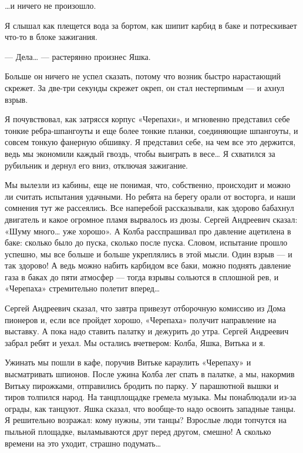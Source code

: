 …и ничего не произошло.

Я слышал  как  плещется  вода  за  бортом,  как  шипит  карбид  в  баке  и
потрескивает что-то в блоке зажигания.

— Дела… — растерянно произнес Яшка.

Больше он ничего не  успел сказать, потому  что возник быстро  нарастающий
скрежет. За две-три секунды скрежет окреп,  он стал нестерпимым — и  ахнул
взрыв.

Я почувствовал,  как затрясся  корпус «Черепахи»,  и мгновенно  представил
себе  тонкие  ребра-шпангоуты  и  еще  более  тонкие  планки,  соединяющие
шпангоуты, и совсем тонкую фанерную обшивку. Я представил себе, на чем все
это держится, ведь мы  экономили каждый гвоздь, чтобы  выиграть в весе…  Я
схватился за рубильник и дернул его вниз, отключая зажигание.

Мы вылезли из кабины, еще не понимая, что, собственно, происходит и  можно
ли считать испытания удачными.  Но ребята на берегу  орали от восторга,  и
наши сомнения тут же рассеялись.  Все наперебой рассказывали, как  здорово
бабахнул двигатель  и  какое  огромное пламя  вырвалось  из  дюзы.  Сергей
Андреевич сказал:  «Шуму  много… уже  хорошо».  А Колба  расспрашивал  про
давление ацетилена в  баке: сколько  было до пуска,  сколько после  пуска.
Словом, испытание прошло  успешно, мы  все больше и  больше укреплялись  в
этой мысли. Один взрыв — и так  здорово! А ведь можно набить карбидом  все
баки, можно поднять давление газа в баках до пяти атмосфер — тогда  взрывы
сольются в сплошной рев, и «Черепаха» стремительно полетит вперед…

Сергей Андреевич сказал, что завтра  привезут отборочную комиссию из  Дома
пионеров и, если  все пройдет  хорошо, «Черепаха»  получит направление  на
выставку. А пока надо ставить палатку и дежурить до утра. Сергей Андреевич
забрал ребят и уехал. Мы остались вчетвером: Колба, Яшка, Витька и я.

Ужинать  мы  пошли   в  кафе,  поручив   Витьке  караулить  «Черепаху»   и
высматривать шпионов.  После  ужина  Колба  лег спать  в  палатке,  а  мы,
накормив Витьку  пирожками, отправились  бродить  по парку.  У  парашютной
вышки  и  тиров  толпился  народ.  На  танцплощадке  гремела  музыка.   Мы
понаблюдали из-за ограды,  как танцуют.  Яшка сказал,  что вообще-то  надо
освоить западные  танцы. Я  решительно возражал:  кому нужны,  эти  танцы?
Взрослые люди  топчутся  на  пыльной  площадке,  выламываются  друг  перед
другом, смешно! А сколько времени на это уходит, страшно подумать…

